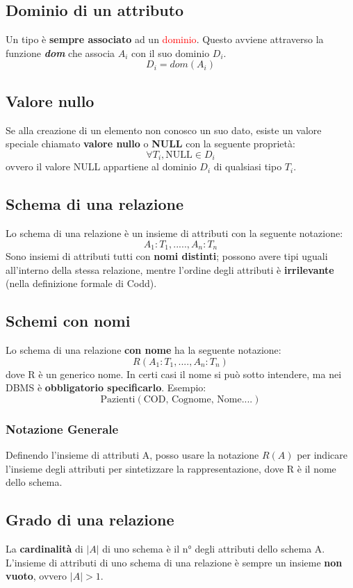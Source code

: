 \documentclass[10pt,twocolumn]{article}
\begin{document}
\subsection{Dominio di un attributo}
Un tipo è \textbf{sempre associato} ad un \textcolor{red}{dominio}. Questo avviene attraverso la funzione \textbf{\textit{dom}} che associa $A_i$ con il suo dominio $D_i$.
\[D_i = dom(A_i)\]
\subsection{Valore nullo}
Se alla creazione di un elemento non conosco un suo dato, esiste un valore speciale chiamato \textbf{valore nullo} o \textbf{NULL} con la seguente proprietà: \[\forall T_i, \text{NULL} \in D_i\] ovvero il valore NULL appartiene al dominio $D_i$ di qualsiasi tipo $T_i$.
\subsection{Schema di una relazione}
Lo schema di una relazione è un insieme di attributi con la seguente notazione: \[A_1 : T_1 ,....., A_n : T_n\] Sono insiemi di attributi tutti con \textbf{nomi distinti}; possono avere tipi uguali all'interno della stessa relazione, mentre l'ordine degli attributi è \textbf{irrilevante} (nella definizione formale di Codd).
\subsection{Schemi con nomi}
Lo schema di una relazione \textbf{con nome} ha la seguente notazione: \[ R(A_1:T_1 ,...., A_n:T_n)\] dove R è un generico nome. In certi casi il nome si può sotto intendere, ma nei DBMS è \textbf{obbligatorio specificarlo}. Esempio:\[\text{Pazienti}(\text{COD, Cognome, Nome....})\]
\subsubsection{Notazione Generale}
Definendo l'insieme di attributi A, posso usare la notazione $R(A)$ per indicare l'insieme degli attributi per sintetizzare la rappresentazione, dove R è il nome dello schema.
\subsection{Grado di una relazione}
La \textbf{cardinalità} di $|A|$ di uno schema è il n° degli attributi dello schema A. L'insieme di attributi di uno schema di una relazione è sempre un insieme \textbf{non vuoto}, ovvero $|A| > 1$.
\end{document}
